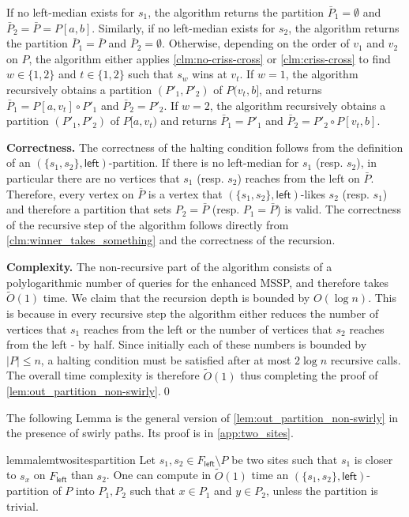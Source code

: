 \documentclass{article}
\newcommand{\leftside}{\mathsf{left}}
\newcommand{\Otild}{\tilde{O}}
\begin{document}
If no left-median exists for $s_1$, the algorithm returns the partition $\bar P_1 = \emptyset$ and $\bar P_2 = \bar P = P[a,b]$.
Similarly, if no left-median exists for $s_2$, the algorithm returns the partition $\bar P_1 = \bar{P}$ and $\bar P_2 = \emptyset$.
Otherwise, depending on the order of $v_1$ and $v_2$ on $P$, the algorithm either applies \cref{clm:no-criss-cross} or \cref{clm:criss-cross} to find $w\in \{ 1,2\}$ and $t\in \{1,2\}$ such that $s_w$ wins at $v_t$.
If $w=1$, the algorithm recursively obtains a partition $(P'_1,P'_2)$ of $P(v_t,b]$, and returns $\bar P_1 = P[a,v_t] \circ P'_1$ and $\bar P_2 = P'_2$.
If $w = 2$, the algorithm recursively obtains a partition $(P'_1,P'_2)$ of $P[a,v_t)$ and returns $\bar P_1 = P'_1$ and $\bar P_2 = P'_2 \circ P[v_t,b]$.

\medskip
\noindent
{\bf Correctness.}
The correctness of the halting condition follows from the definition of an $(\{s_1,s_2\},\leftside)$-partition.
If there is no left-median for $s_1$ (resp. $s_2$), in particular there are no vertices that $s_1$ (resp. $s_2$) reaches from the left on $\bar P$.
Therefore, every vertex on $\bar P$ is a vertex that $(\{s_1,s_2\},\leftside)$-likes $s_2$ (resp. $s_1$) and therefore a partition that sets $P_2 = \bar P$ (resp. $P_1 = \bar{P}$) is valid.
The correctness of the recursive step of the algorithm follows directly from \cref{clm:winner_takes_something} and the correctness of the recursion.

\medskip
\noindent
{\bf Complexity.}
The non-recursive part of the algorithm consists of a polylogarithmic number of queries for the enhanced MSSP, and therefore takes $\Otild(1)$ time.
We claim that the recursion depth is bounded by $O(\log n)$.
This is because in every recursive step the algorithm either reduces the number of vertices that $s_1$ reaches from the left or the number of vertices that $s_2$ reaches from the left - by half.
Since initially each of these numbers is bounded by $|P| \le n$, a halting condition must be satisfied after at most $2 \log n$ recursive calls.
The overall time complexity is therefore $\Otild(1)$ thus completing the proof of \cref{lem:out_partition_non-swirly}.\qed


\medskip
The following Lemma is the general version of \cref{lem:out_partition_non-swirly} in the presence of swirly paths. Its proof is in \cref{app:two_sites}.


\begin{restatable}{lemma}{lemtwositespartition} \label{lem:s1s2partition}
Let $s_1,s_2\in F_{\leftside}\setminus P$ be two sites such that $s_1$ is closer to $s_x$ on $F_{\leftside}$ than $s_2$.
One can compute in $\Otild(1)$ time an $(\{s_1,s_2\},\leftside)$-partition of $P$ into $P_1,P_2$ such that $x\in  P_1$ and $y\in P_2$, unless the partition is trivial.
\end{restatable}
\end{document}
